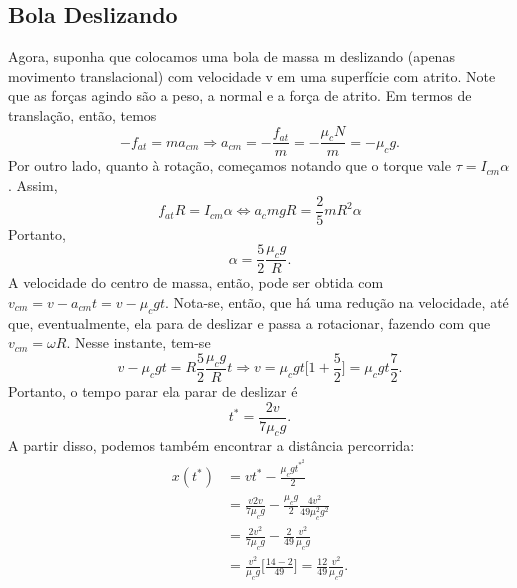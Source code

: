 \documentclass[physicsII_notes.tex]{subfiles}
\begin{document}
\subsection{Bola Deslizando}
Agora, suponha que colocamos uma bola de massa m deslizando (apenas movimento translacional) com velocidade v em uma superfície com atrito. Note que as forças agindo são
a peso, a normal e a força de atrito. Em termos de translação, então, temos
\[
	-f_{at} = ma_{cm} \Rightarrow a_{cm} = -\frac{f_{at}}{m} = -\frac{\mu_{c}N}{m} = -\mu_{c}g.
\]
Por outro lado, quanto à rotação, começamos notando que o torque vale \(\tau = I_{cm}\alpha \). Assim,
\[
	f_{at}R = I_{cm}\alpha \Longleftrightarrow a_{c}mgR = \frac{2}{5}mR^{2}\alpha
\]
Portanto,
\[
	\alpha = \frac{5}{2}\frac{\mu_{c}g}{R}.
\]
A velocidade do centro de massa, então, pode ser obtida com \(v_{cm} = v - a_{cm}t = v - \mu_{c}gt\). Nota-se, então,
que há uma redução na velocidade, até que, eventualmente, ela para de deslizar e passa a rotacionar, fazendo com que \(v_{cm} = \omega R\).
Nesse instante, tem-se
\[
	v-\mu_{c}gt = R\frac{5}{2}\frac{\mu_{c}g}{R}t \Rightarrow v = \mu_{c}gt\biggl[1+\frac{5}{2}\biggr] = \mu_{c}gt \frac{7}{2}.
\]
Portanto, o tempo parar ela parar de deslizar é
\[
	\boxed{t^{*} = \frac{2v}{7\mu_{c}g}.}
\]
A partir disso, podemos também encontrar a distância percorrida:
\begin{align*}
	x(t^{*}) & = vt^{*} - \frac{\mu_{c}gt^{*^{2}}}{2}                                                               \\
	         & = \frac{v2v}{7\mu_{c}g} - \frac{\mu_{c}g}{2}\frac{4v^{2}}{49\mu_{c}^{2}g^{2}}                        \\
	         & = \frac{2v^{2}}{7\mu_{c}g} - \frac{2}{49}\frac{v^{2}}{\mu_{c}g}                                      \\
	         & = \frac{v^{2}}{\mu_{c}g}\biggl[\frac{14-2}{49}\biggr] = \boxed{\frac{12}{49}\frac{v^{2}}{\mu_{c}g}.}
\end{align*}
\end{document}
